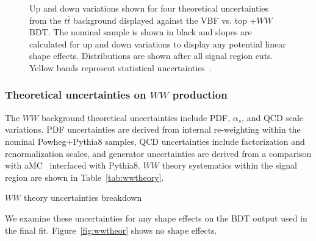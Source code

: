 \begin{figure}[!h]
{  }%
{\caption{Up and down variations shown for four theoretical uncertainties from the $t\bar{t}$ background displayed against the VBF vs. top +$WW$ BDT. The nominal sample is shown in black and slopes are calculated for up and down variations to display any potential linear shape effects. Distributions are shown after all signal region cuts. Yellow bands represent statistical uncertainties~\cite{ourSupportNote}.
\label{fig:ttbartheory}}}
\end{figure}

\subsubsection{Theoretical uncertainties on $WW$ production}

The $WW$ background theoretical uncertainties include PDF, $\alpha_s$, and QCD scale variations. PDF uncertainties are derived from internal re-weighting within the nominal Powheg$+$Pythia8 samples, QCD uncertainties include factorization and renormalization scales, and generator uncertainties are derived from a comparison with aMC\@NLO~\cite{MG5} interfaced with Pythia8. $WW$ theory systematics within the signal region are shown in Table~\ref{tab:wwtheory}.

\begin{table}[h!]
\centering
\scalebox{1.0}{

}
\caption{$WW$ theory uncertainties breakdown}
\label{tab:wwtheory}
\end{table}

We examine these uncertainties for any shape effects on the BDT output used in the final fit. Figure~\ref{fig:wwtheor} shows no shape effects.


